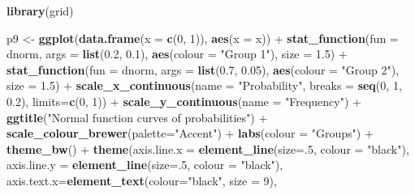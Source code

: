 \documentclass[]{article}
\newenvironment{Shaded}{\begin{snugshade}}{\end{snugshade}}
\newcommand{\KeywordTok}[1]{\textcolor[rgb]{0.13,0.29,0.53}{\textbf{{#1}}}}
\newcommand{\DataTypeTok}[1]{\textcolor[rgb]{0.13,0.29,0.53}{{#1}}}
\newcommand{\DecValTok}[1]{\textcolor[rgb]{0.00,0.00,0.81}{{#1}}}
\newcommand{\FloatTok}[1]{\textcolor[rgb]{0.00,0.00,0.81}{{#1}}}
\newcommand{\StringTok}[1]{\textcolor[rgb]{0.31,0.60,0.02}{{#1}}}
\newcommand{\NormalTok}[1]{{#1}}
\begin{document}
\begin{Shaded}
\begin{Highlighting}[]
\KeywordTok{library}\NormalTok{(grid) }

\NormalTok{p9 <-}\StringTok{ }\KeywordTok{ggplot}\NormalTok{(}\KeywordTok{data.frame}\NormalTok{(}\DataTypeTok{x =} \KeywordTok{c}\NormalTok{(}\DecValTok{0}\NormalTok{, }\DecValTok{1}\NormalTok{)), }\KeywordTok{aes}\NormalTok{(}\DataTypeTok{x =} \NormalTok{x)) +}
\StringTok{      }\KeywordTok{stat_function}\NormalTok{(}\DataTypeTok{fun =} \NormalTok{dnorm, }\DataTypeTok{args =} \KeywordTok{list}\NormalTok{(}\FloatTok{0.2}\NormalTok{, }\FloatTok{0.1}\NormalTok{),}
                    \KeywordTok{aes}\NormalTok{(}\DataTypeTok{colour =} \StringTok{"Group 1"}\NormalTok{), }\DataTypeTok{size =} \FloatTok{1.5}\NormalTok{) +}
\StringTok{      }\KeywordTok{stat_function}\NormalTok{(}\DataTypeTok{fun =} \NormalTok{dnorm, }\DataTypeTok{args =} \KeywordTok{list}\NormalTok{(}\FloatTok{0.7}\NormalTok{, }\FloatTok{0.05}\NormalTok{),}
                    \KeywordTok{aes}\NormalTok{(}\DataTypeTok{colour =} \StringTok{"Group 2"}\NormalTok{), }\DataTypeTok{size =} \FloatTok{1.5}\NormalTok{) +}
\StringTok{      }\KeywordTok{scale_x_continuous}\NormalTok{(}\DataTypeTok{name =} \StringTok{"Probability"}\NormalTok{,}
                         \DataTypeTok{breaks =} \KeywordTok{seq}\NormalTok{(}\DecValTok{0}\NormalTok{, }\DecValTok{1}\NormalTok{, }\FloatTok{0.2}\NormalTok{),}
                         \DataTypeTok{limits=}\KeywordTok{c}\NormalTok{(}\DecValTok{0}\NormalTok{, }\DecValTok{1}\NormalTok{)) +}
\StringTok{      }\KeywordTok{scale_y_continuous}\NormalTok{(}\DataTypeTok{name =} \StringTok{"Frequency"}\NormalTok{) +}
\StringTok{      }\KeywordTok{ggtitle}\NormalTok{(}\StringTok{"Normal function curves of probabilities"}\NormalTok{) +}
\StringTok{      }\KeywordTok{scale_colour_brewer}\NormalTok{(}\DataTypeTok{palette=}\StringTok{"Accent"}\NormalTok{) +}
\StringTok{      }\KeywordTok{labs}\NormalTok{(}\DataTypeTok{colour =} \StringTok{"Groups"}\NormalTok{) +}
\StringTok{      }\KeywordTok{theme_bw}\NormalTok{() +}
\StringTok{      }\KeywordTok{theme}\NormalTok{(}\DataTypeTok{axis.line.x =} \KeywordTok{element_line}\NormalTok{(}\DataTypeTok{size=}\NormalTok{.}\DecValTok{5}\NormalTok{, }\DataTypeTok{colour =} \StringTok{"black"}\NormalTok{),}
            \DataTypeTok{axis.line.y =} \KeywordTok{element_line}\NormalTok{(}\DataTypeTok{size=}\NormalTok{.}\DecValTok{5}\NormalTok{, }\DataTypeTok{colour =} \StringTok{"black"}\NormalTok{),}
            \DataTypeTok{axis.text.x=}\KeywordTok{element_text}\NormalTok{(}\DataTypeTok{colour=}\StringTok{"black"}\NormalTok{, }\DataTypeTok{size =} \DecValTok{9}\NormalTok{), }

\end{Highlighting}
\end{Shaded}
\end{document}
